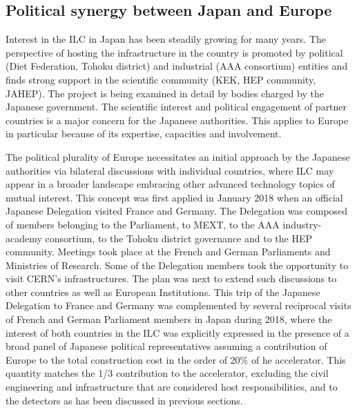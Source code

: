 \documentclass[%
 reprint,
 floatfix,
 amsmath,amssymb,
 aps,
]{revtex4-1}
\begin{document}
\subsection{\label{sec:discussionPol}Political synergy between Japan and Europe}
Interest in the ILC in Japan has been steadily growing for many years. The perspective of hosting the infrastructure in the country is promoted by political (Diet Federation, Tohoku district)
and industrial (AAA consortium) entities and finds strong support in the scientific community (KEK,
HEP community, JAHEP). The project is being examined in detail by bodies charged by the Japanese government. The scientific interest and political
engagement of partner countries is a major concern for the Japanese authorities. This
applies  to Europe in particular because of its expertise, capacities and involvement.

The political plurality of Europe necessitates an initial approach by the Japanese
authorities via bilateral discussions with individual countries, where ILC may appear in a broader
landscape embracing other advanced technology topics of mutual interest. This concept was first applied
in January 2018 when an official Japanese Delegation visited France and Germany. The Delegation
was composed of members belonging to the Parliament, to MEXT, to the AAA industry-academy
consortium, to the Tohoku district governance and to the HEP community. Meetings took place at
the French and German Parliaments and Ministries of Research. Some of the Delegation members took the opportunity
to visit CERN's infrastructures. The plan was next to extend such discussions to other countries as well as European
Institutions. This trip of the Japanese Delegation to France and Germany was complemented by several reciprocal
visits of French and German Parliament members in Japan during 2018, where the interest of
both countries in the ILC was explicitly expressed in the presence of a broad panel of Japanese political
representatives assuming a contribution of Europe to the total construction cost in the order of 20\% of he accelerator. This quantity matches the 1/3 contribution to the accelerator, excluding the civil engineering and infrastructure that are considered host responsibilities, and to the detectors as has been discussed in previous sections.
\end{document}
